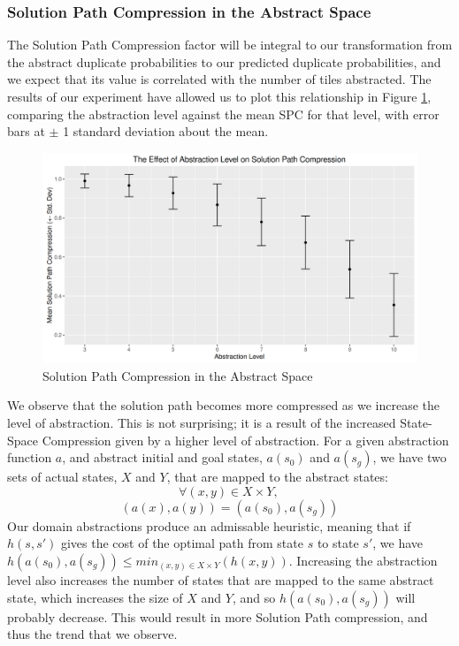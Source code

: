 \documentclass{article}
\begin{document}
\subsubsection*{Solution Path Compression in the Abstract Space}
The Solution Path Compression factor will be integral to our transformation from the abstract duplicate probabilities
to our predicted duplicate probabilities, and we expect that its value is correlated with
the number of tiles abstracted. The results of our experiment have allowed us to plot this relationship in Figure \ref{fig:spc},
comparing the abstraction level against the mean SPC for that level,
with error bars at \(\pm\) 1 standard deviation about the mean. \\

\begin{figure}
  \centering
  \includegraphics[width=1\textwidth]{path_compression_plot}
  \caption{Solution Path Compression in the Abstract Space}
  \label{fig:spc}
\end{figure}


We observe that the solution path becomes more compressed as we increase
the level of abstraction. This is not surprising; it is a result of the
increased State-Space Compression given by a higher level of abstraction.
For a given abstraction function \(a\),
and abstract initial and goal states, \(a(s_0)\) and \(a(s_g) \),
we have two sets of actual states, \(X\) and \(Y\),
that are  mapped to the abstract states:
\[\forall (x, y) \in X \times Y \text{, } \]
\[(a(x), a(y)) = (a(s_0), a(s_g))\]
Our domain abstractions produce an admissable heuristic,
meaning that if \(h(s, s')\) gives the cost of the optimal path from state
\(s\) to state \(s'\), we have \(h(a(s_0), a(s_g)) \leq min_{(x,y) \in X \times Y} (h(x, y))\).
Increasing the abstraction level also increases the number of states that are mapped to the same abstract state,
which increases the size of \(X\) and \(Y\),
and so \(h(a(s_0), a(s_g))\) will probably decrease. This would result in more Solution Path compression,
and thus the trend that we observe.\\
\end{document}
